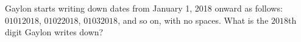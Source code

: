 Gaylon starts writing down dates from January 1, 2018 onward as follows: $01012018$, $01022018$, $01032018$, and so on, with no spaces. What is the $2018$th digit Gaylon writes down?
